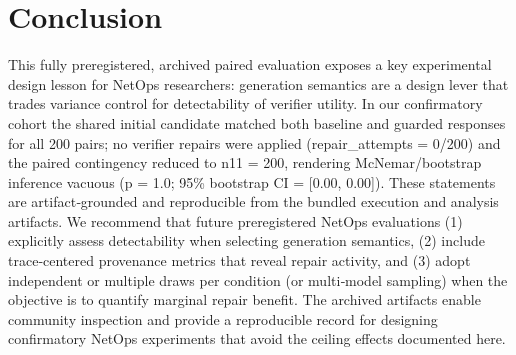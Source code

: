 \documentclass[conference]{IEEEtran}
\begin{document}
\section{Conclusion}
This fully preregistered, archived paired evaluation exposes a key experimental design lesson for NetOps researchers: generation semantics are a design lever that trades variance control for detectability of verifier utility. In our confirmatory cohort the shared initial candidate matched both baseline and guarded responses for all 200 pairs; no verifier repairs were applied (repair\_attempts = 0/200) and the paired contingency reduced to n11 = 200, rendering McNemar/bootstrap inference vacuous (p = 1.0; 95\% bootstrap CI = [0.00, 0.00]). These statements are artifact‑grounded and reproducible from the bundled execution and analysis artifacts. We recommend that future preregistered NetOps evaluations (1) explicitly assess detectability when selecting generation semantics, (2) include trace‑centered provenance metrics that reveal repair activity, and (3) adopt independent or multiple draws per condition (or multi‑model sampling) when the objective is to quantify marginal repair benefit. The archived artifacts enable community inspection and provide a reproducible record for designing confirmatory NetOps experiments that avoid the ceiling effects documented here.
\end{document}
